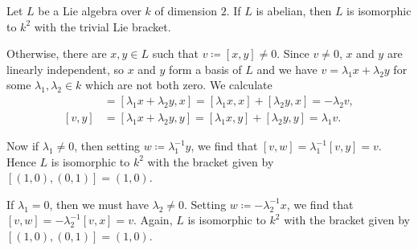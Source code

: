 Let $L$ be a Lie algebra over $k$ of dimension $2$.
If $L$ is abelian, then $L$ is isomorphic to $k^2$ with the trivial Lie bracket.

Otherwise, there are $x, y \in L$ such that $v\coloneqq [x, y] \neq 0$. Since $v\neq 0$,
$x$ and $y$ are linearly independent, so $x$ and $y$ form a basis of $L$ and
we have $v = \lambda_1x + \lambda_2y$ for some $\lambda_1, \lambda_2 \in k$ which
are not both zero. We calculate
\begin{align*}
	[v, x] &= [\lambda_1x + \lambda_2 y, x] = [\lambda_1x, x] + [\lambda_2y, x] = -\lambda_2v,\\
	[v, y] &= [\lambda_1x + \lambda_2 y, y] = [\lambda_1x, y] + [\lambda_2y, y] = \lambda_1v.
\end{align*}

Now if $\lambda_1 \neq 0$, then setting $w\coloneqq \lambda_1^{-1}y$, we find
that $[v, w] = \lambda_1^{-1}[v, y] = v$. Hence $L$ is isomorphic  to $k^2$ with
the bracket given by $[(1, 0), (0, 1)] = (1, 0)$.

If $\lambda_1 = 0$, then we must have $\lambda_2 \neq 0$. Setting $w\coloneqq -\lambda_2^{-1}x$,
we find that $[v, w] = -\lambda_2^{-1}[v, x] = v$. Again, $L$ is isomorphic to
$k^2$ with the bracket given by $[(1, 0), (0, 1)] = (1, 0)$.

